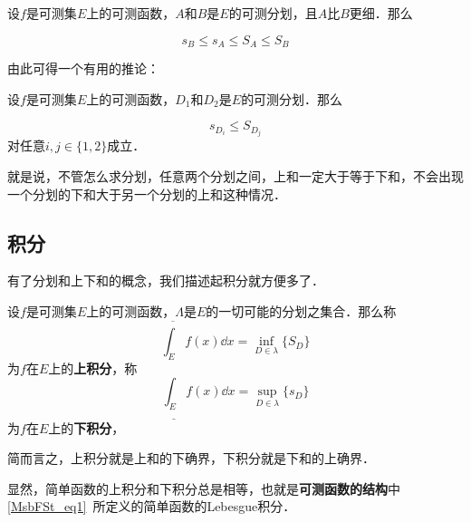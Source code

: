 \begin{lemma}{}\label{Lebes1_lem1}

设$f$是可测集$E$上的可测函数，$A$和$B$是$E$的可测分划，且$A$比$B$更细．那么

\begin{equation}
s_B\leq s_A\leq S_A\leq S_B
\end{equation}


\end{lemma}

由此可得一个有用的推论：

\begin{corollary}{}\label{Lebes1_cor1}
设$f$是可测集$E$上的可测函数，$D_1$和$D_2$是$E$的可测分划．那么

\begin{equation}
s_{D_i}\leq S_{D_j}
\end{equation}
对任意$i, j\in\{1, 2\}$成立．

\end{corollary}

就是说，不管怎么求分划，任意两个分划之间，上和一定大于等于下和，不会出现一个分划的下和大于另一个分划的上和这种情况．






\subsection{积分}

有了分划和上下和的概念，我们描述起积分就方便多了．

\begin{definition}{}

设$f$是可测集$E$上的可测函数，$\Lambda$是$E$的一切可能的分划之集合．那么称
\begin{equation}
\overline{\int_E} f(x) \dd x=\inf_{D\in \lambda} \{S_D\}
\end{equation}
为$f$在$E$上的\textbf{上积分}，称
\begin{equation}
\underline{\int_E} f(x) \dd x=\sup_{D\in \lambda} \{s_D\}
\end{equation}
为$f$在$E$上的\textbf{下积分}，



\end{definition}

简而言之，上积分就是上和的下确界，下积分就是下和的上确界．

显然，简单函数的上积分和下积分总是相等，也就是\textbf{可测函数的结构}中\autoref{MsbFSt_eq1}~所定义的简单函数的Lebesgue积分．

